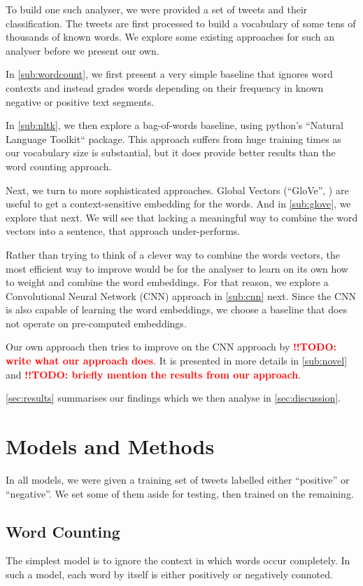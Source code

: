 \documentclass[10pt,conference,compsocconf]{IEEEtran}
\newcommand{\todoThis}[1]{\textcolor{red}{\textbf{!!TODO: #1}}}
\begin{document}
To build one such analyser, we were provided a set of tweets and their classification. The tweets are first processed to build a vocabulary of some tens of thousands of known words. We explore some existing approaches for such an analyser before we present our own.

In \autoref{sub:wordcount}, we first present a very simple baseline that ignores word contexts and instead grades words depending on their frequency in known negative or positive text segments.

In \autoref{sub:nltk}, we then explore a bag-of-words baseline, using python's ``Natural Language Toolkit`` package. This approach suffers from huge training times as our vocabulary size is substantial, but it does provide better results than the word counting approach.

Next, we turn to more sophisticated approaches.
Global Vectors (``GloVe'', \cite{glove_paper}) are useful to get a context-sensitive embedding for the words. And in \autoref{sub:glove}, we explore that next.
We will see that lacking a meaningful way to combine the word vectors into a sentence, that approach under-performs.

Rather than trying to think of a clever way to combine the words vectors, the most efficient way to improve would be for the analyser to learn on its own how to weight and combine the word embeddings. For that reason, we explore a Convolutional Neural Network (CNN) approach in \autoref{sub:cnn} next. Since the CNN is also capable of learning the word embeddings, we choose a baseline that does not operate on pre-computed embeddings.

Our own approach then tries to improve on the CNN approach by \todoThis{write what our approach does}. It is presented in more details in \autoref{sub:novel} and \todoThis{briefly mention the results from our approach}.

\autoref{sec:results} summarises our findings which we then analyse in \autoref{sec:discussion}.
  
\section{Models and Methods}\label{sec:models}
In all models, we were given a training set of tweets labelled either ``positive'' or ``negative''.
We set some of them aside for testing, then trained on the remaining.

\subsection{Word Counting}\label{sub:wordcount}
The simplest model is to ignore the context in which words occur completely. In such a model, each word by itself is either positively or negatively connoted.
\end{document}
